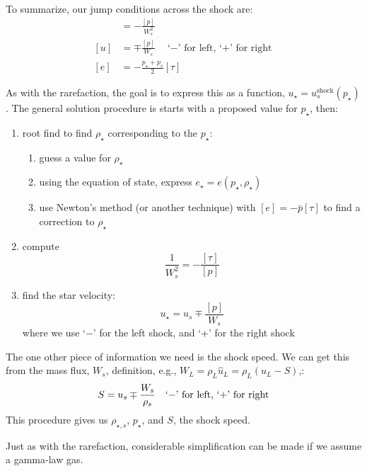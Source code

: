 To summarize, our jump conditions across the shock are:
\begin{align}
[\tau] &= -\frac{[p]}{W_s^2} \\
[u] &= \mp \frac{[p]}{W_s} \quad\mbox{`$-$' for left, `+' for right}\\
[e] &= - \frac{p_\star + p_s}{2} [\tau] \label{eq:euler:shock:ejump}
\end{align}

As with the rarefaction, the goal is to express this as a function, $u_\star
= u_s^\mathrm{shock}(p_\star)$.  The general solution procedure is starts with
a proposed value for $p_\star$, then:
\begin{enumerate}
\item root find to find $\rho_\star$ corresponding to the $p_\star$:
  \begin{enumerate}
  \item guess a value for $\rho_\star$
  \item using the equation of state, express $e_\star = e(p_\star, \rho_\star)$
  \item use Newton's method (or another technique) with $[e] = -\bar{p} [\tau]$
     to find a correction to $\rho_\star$
  \end{enumerate}
\item compute
  \begin{equation}
    \frac{1}{W_s^2} = - \frac{[\tau]}{[p]}
  \end{equation}
\item find the star velocity:
  \begin{equation}
    u_\star = u_s \mp \frac{[p]}{W_s}
  \end{equation}
  where we use `$-$' for the left shock, and `+' for the right shock
\end{enumerate}

The one other piece of information we need is the shock speed.  We can
get this from the mass flux, $W_s$, definition, e.g., $W_L = \rho_L
\hat{u}_L = \rho_L (u_L - S)$,:
\begin{equation}
\label{eq:euler-theory:shockgeneral}
S = u_s \mp \frac{W_s}{\rho_s} \quad\mbox{`$-$' for left, `+' for right}\\
\end{equation}
This procedure gives us $\rho_{\star,s}$, $p_\star$, and $S$, the
shock speed.

Just as with the rarefaction, considerable simplification can be made
if we assume a gamma-law gas.

